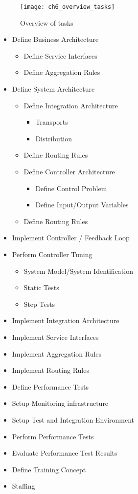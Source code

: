 \begin{figure}[htpb] \centering 
	\texttt{[image: ch6\_overview\_tasks]} 
	\caption{Overview of tasks} 
	\label{fig:ch6_overview_tasks} 
\end{figure}

\begin{itemize}
	\item Define Business Architecture
	\begin{itemize}
		\item Define Service Interfaces
		\item Define Aggregation Rules
	\end{itemize}
	\item Define System Architecture 
	\begin{itemize}
		\item Define Integration Architecture
		\begin{itemize}
			\item Transports
			\item Distribution
		\end{itemize}
		\item Define Routing Rules
		\item Define Controller Architecture 
		\begin{itemize}
			\item Define Control Problem 
			\item Define Input/Output Variables 
		\end{itemize}
		\item Define Routing Rules
	\end{itemize}
	\item Implement Controller / Feedback Loop
	\item Perform Controller Tuning 
	\begin{itemize}
		\item System Model/System Identification 
		\item Static Tests
		\item Step Tests
	\end{itemize}
	\item Implement Integration Architecture
	\item Implement Service Interfaces
	\item Implement Aggregation Rules 
	\item Implement Routing Rules
	\item Define Performance Tests 
	\item Setup Monitoring infrastructure
	\item Setup Test and Integration Environment
	\item Perform Performance Tests
	\item Evaluate Performance Test Results
	\item Define Training Concept
	\item Staffing
\end{itemize}

